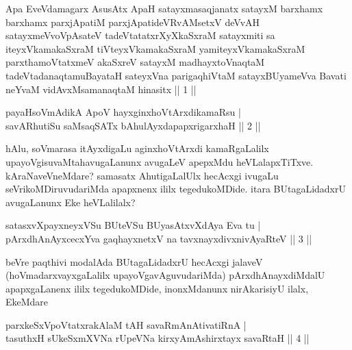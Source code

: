 
\begin{shl}
Apa EveVdamagarx AsusAtx ApaH satayxmasaqjanatx satayxM barxhamx barxhamx parxjApatiM parxjApatideVRvAMsetxV deVvAH satayxmeVvoVpAsateV tadeVtatatxrXyXkaSxraM satayxmiti sa iteyxVkamakaSxraM tiVteyxVkamakaSxraM yamiteyxVkamakaSxraM parxthamoVtatxmeV akaSxreV satayxM madhayxtoV\s naqtaM tadeVtadanaqtamuBayataH sateyxVna parigaqhiVtaM satayxBUyameVva Bavati neYvaM vidAvxMsamanaqtaM hinasitx || 1 ||
\end{shl}


\begin{shl}
payaHsoVmAdikA ApoV hayxginxhoVtArxdikamaRsu | \\
savARhutiSu saMsaqSATx bAhulAyxdapapxrigarxhaH \hfill ||  2 || 
\end{shl}

\begin{artha}
hAlu, soVmarasa itAyxdigaLu aginxhoVtArxdi kamaRgaLalilx upayoVgisuvaMtahavugaLanunx avugaLeV apepxMdu heVLalapxTiTxve. kAraNaveVneMdare? samasatx AhutigaLalUlx hecAcxgi ivugaLu seVrikoMDiruvudariMda apapxnenx ililx tegedukoMDide. itara BUtagaLidadxrU avugaLanunx Eke heVLalilalx?
\end{artha}

\begin{shl}
satasxvXpayxneyxVSu BUteVSu BUyasAtxvXdAya Eva tu | \\
pArxdhAnAyxcecxYva gaqhayxnetxV na tavxnayxdivxnivAyaRteV \hfill ||  3 || 
\end{shl}

\begin{artha}
beVre paqthivi modalAda BUtagaLidadxrU hecAcxgi jalaveV (hoVmadarxvayxgaLalilx upayoVgavAguvudariMda) pArxdhAnayxdiMdalU apapxgaLanenx ililx tegedukoMDide, inonxMdanunx nirAkarisiyU ilalx, EkeMdare \mdash 
\end{artha}

\begin{shl}
parxkeSxVpoVtatxrakAlaM tAH savaRmAnAtivatiRnA | \\
tasuthxH sUkeSxmXVNa rUpeVNa kirxyAmAshirxtayx savaRtaH \hfill ||  4 || 
\end{shl}

